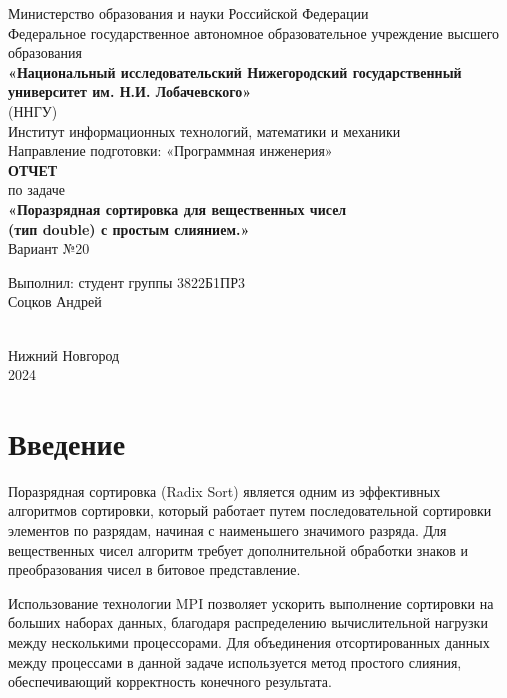 \documentclass[12pt]{article}
\begin{document}
\begin{titlepage}
    \centering
    \large
    Министерство образования и науки Российской Федерации\\
    Федеральное государственное автономное образовательное учреждение высшего образования\\
    \textbf{«Национальный исследовательский Нижегородский государственный университет им. Н.И. Лобачевского»}\\
    (ННГУ)\\[1cm]
    Институт информационных технологий, математики и механики\\
    Направление подготовки: «Программная инженерия»\\[2cm]

    {\Large \textbf{ОТЧЕТ}}\\[0.5cm]
    {\Large по задаче}\\[0.5cm]
    {\Large \textbf{«Поразрядная сортировка для вещественных чисел \\ (тип double) с простым слиянием.»}}\\[0.5cm]
    {\Large Вариант №20}\\[5cm]

    \hfill\parbox{0.5\textwidth}{
        Выполнил: студент группы 3822Б1ПР3\\
        Соцков Андрей
    }\\[4cm]

    Нижний Новгород\\
    2024
\end{titlepage}

\thispagestyle{empty}
\clearpage
{} 
\setcounter{page}{2} 
\tableofcontents
\clearpage
\setcounter{page}{3} 
\section{Введение}

\hspace*{1.25em}Поразрядная сортировка (Radix Sort) является одним из эффективных алгоритмов сортировки, который работает путем последовательной сортировки элементов по разрядам, начиная с наименьшего значимого разряда. Для вещественных чисел алгоритм требует дополнительной обработки знаков и преобразования чисел в битовое представление.

Использование технологии MPI позволяет ускорить выполнение сортировки на больших наборах данных, благодаря распределению вычислительной нагрузки между несколькими процессорами. Для объединения отсортированных данных между процессами в данной задаче используется метод простого слияния, обеспечивающий корректность конечного результата.
\end{document}
